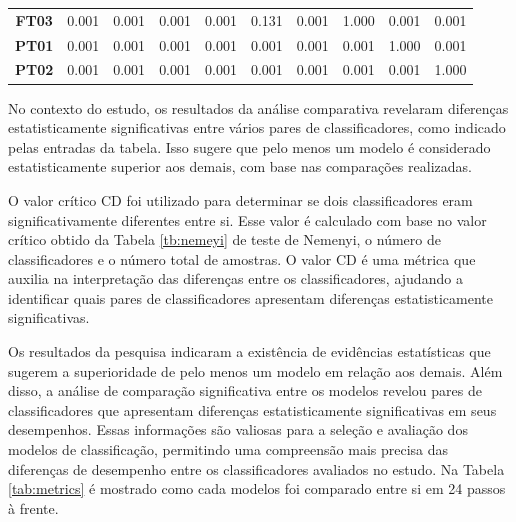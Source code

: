 \begin{table}[!htb]
\begin{tabular}{@{}clllllllll@{}}
		\textbf{FT03}                       & 0.001                          & 0.001                          & 0.001                          & 0.001                          & 0.131                          & 0.001                          & 1.000                          & 0.001                          & 0.001                          \\
		\textbf{PT01}                       & 0.001                          & 0.001                          & 0.001                          & 0.001                          & 0.001                          & 0.001                          & 0.001                          & 1.000                          & 0.001                          \\
		\textbf{PT02}                       & 0.001                          & 0.001                          & 0.001                          & 0.001                          & 0.001                          & 0.001                          & 0.001                          & 0.001                          & 1.000                          \\ \bottomrule
	\end{tabular}
\end{table}



No contexto do estudo, os resultados da análise comparativa revelaram diferenças estatisticamente significativas entre vários pares de classificadores, como indicado pelas entradas da tabela. Isso sugere que pelo menos um modelo é considerado estatisticamente superior aos demais, com base nas comparações realizadas.

O valor crítico CD foi utilizado para determinar se dois classificadores eram significativamente diferentes entre si. Esse valor é calculado com base no valor crítico obtido da Tabela \ref{tb:nemeyi} de teste de Nemenyi, o número de classificadores e o número total de amostras. O valor CD é uma métrica que auxilia na interpretação das diferenças entre os classificadores, ajudando a identificar quais pares de classificadores apresentam diferenças estatisticamente significativas.

Os resultados da pesquisa indicaram a existência de evidências estatísticas que sugerem a superioridade de pelo menos um modelo em relação aos demais. Além disso, a análise de comparação significativa entre os modelos revelou pares de classificadores que apresentam diferenças estatisticamente significativas em seus desempenhos. Essas informações são valiosas para a seleção e avaliação dos modelos de classificação, permitindo uma compreensão mais precisa das diferenças de desempenho entre os classificadores avaliados no estudo. Na Tabela \ref{tab:metrics} é mostrado como cada modelos foi comparado entre si em 24 passos à frente.

